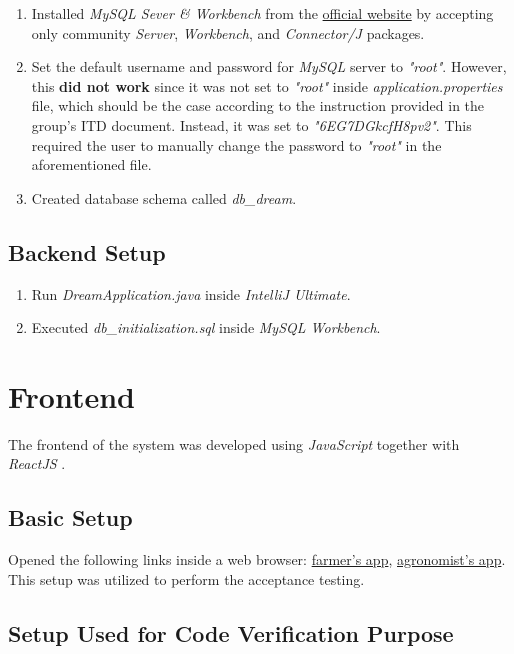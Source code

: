 \begin{enumerate}
    \item Installed \textit{MySQL Sever \& Workbench} from the \href{https://dev.mysql.com/downloads/installer/}{official website} by accepting only community \textit{Server}, \textit{Workbench}, and \textit{Connector/J} packages.
    \item Set the default username and password for \textit{MySQL} server to \textit{"root"}. However, this \textbf{did not work} since it was not set to \textit{"root"} inside \textit{application.properties} file, which should be the case according to the instruction provided in the group's ITD document. Instead, it was set to \textit{"6EG7DGkcfH8pv2"}. This required the user to manually change the password to \textit{"root"} in the aforementioned file.
    \item Created database schema called \textit{db\_dream}.
\end{enumerate}

\subsection{Backend Setup}

\begin{enumerate}
    \item Run \textit{DreamApplication.java} inside \textit{IntelliJ Ultimate}.
    \item Executed \textit{db\_initialization.sql} inside \textit{MySQL Workbench}.
\end{enumerate}

\section{Frontend}

The frontend of the system was developed using \textit{JavaScript} together with \textit{ReactJS} \cite{reactjs}.

\subsection{Basic Setup}

Opened the following links inside a web browser: \href{https://dreamfarmerse2.firebaseapp.com}{farmer's app}, \href{https://dreamagronomistse2.firebaseapp.com}{agronomist's app}. This setup was utilized to perform the acceptance testing.

\subsection{Setup Used for Code Verification Purpose}

